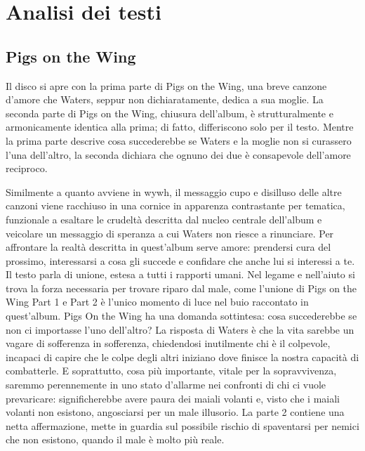 \documentclass[class=book, crop=false, oneside, 12pt]{standalone}
\begin{document}
    \section{Analisi dei testi}
    \label{sec:02-animals-lyrics}

    \subsection{Pigs on the Wing}
    Il disco si apre con la prima parte di Pigs on the Wing, una breve canzone d'amore che Waters, seppur non dichiaratamente, dedica a sua moglie. La seconda parte di Pigs on the Wing, chiusura dell'album, è strutturalmente e armonicamente  identica alla prima; di fatto, differiscono solo per il testo. Mentre la prima parte descrive cosa succederebbe se Waters e la moglie non si curassero l'una dell'altro, la seconda dichiara che ognuno dei due è consapevole dell'amore reciproco. 

    Similmente a quanto avviene in \acrlong{wywh}, il messaggio cupo e disilluso delle altre canzoni viene racchiuso in una cornice in apparenza contrastante per tematica, funzionale a esaltare le crudeltà descritta dal nucleo centrale dell'album e veicolare un messaggio di speranza a cui Waters non riesce a rinunciare. Per affrontare la realtà descritta in quest'album serve amore: prendersi cura del prossimo, interessarsi a cosa gli succede e confidare che anche lui si interessi a te. Il testo parla di unione, estesa a tutti i rapporti umani. Nel legame e nell'aiuto si trova la forza necessaria per trovare riparo dal male, come l'unione di Pigs on the Wing Part 1 e Part 2  è l'unico momento di luce nel buio raccontato in quest'album. Pigs On the Wing ha una domanda sottintesa: cosa succederebbe se non ci importasse l'uno dell'altro? La risposta di Waters è che la vita sarebbe un vagare di sofferenza in sofferenza, chiedendosi inutilmente chi è il colpevole, incapaci di capire che le colpe degli altri iniziano dove finisce la nostra capacità di combatterle. E soprattutto, cosa più importante, vitale per la sopravvivenza, saremmo perennemente in uno stato d'allarme nei confronti di chi ci vuole prevaricare: significherebbe avere paura dei maiali volanti e, visto che i maiali volanti non esistono, angosciarsi per un male illusorio. La parte 2 contiene una netta affermazione, mette in guardia sul possibile rischio di spaventarsi per nemici che non esistono, quando il male è molto più reale. 
\end{document}

